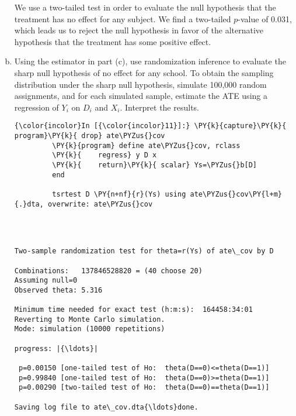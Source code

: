\documentclass[11pt,notitlepage]{article}\usepackage[]{graphicx}\usepackage[]{color}
\makeatletter
\newenvironment{kframe}{%
 \def\at@end@of@kframe{}%
 \ifinner\ifhmode%
  \def\at@end@of@kframe{\end{minipage}}%
  \begin{minipage}{\columnwidth}%
 \fi\fi%
 \def\FrameCommand##1{\hskip\@totalleftmargin \hskip-\fboxsep
 \colorbox{shadecolor}{##1}\hskip-\fboxsep
     \hskip-\linewidth \hskip-\@totalleftmargin \hskip\columnwidth}%
 \MakeFramed {\advance\hsize-\width
   \@totalleftmargin\z@ \linewidth\hsize
   \@setminipage}}%
 {\par\unskip\endMakeFramed%
 \at@end@of@kframe}
\newenvironment{knitrout}{}{} %
\makeatother
\begin{document}
\begin{enumerate}[a)]
\begin{knitrout}
\end{knitrout}
We use a two-tailed test in order to evaluate the null hypothesis that the treatment has no effect for any subject.  We find a two-tailed $p$-value of 0.031, which leads us to reject the null hypothesis in favor of the alternative hypothesis that the treatment has some positive effect.

\item Using the estimator in part (c), use randomization inference to evaluate the sharp null hypothesis of no effect for any school. To obtain the sampling distribution under the sharp null hypothesis, simulate 100,000 random assignments, and for each simulated sample, estimate the ATE using a regression of $Y_i$ on $D_i$ and $X_i$.  Interpret the results.

\begin{knitrout}
\color{fgcolor}\begin{kframe}
    \begin{Verbatim}[commandchars=\\\{\}]
{\color{incolor}In [{\color{incolor}11}]:} \PY{k}{capture}\PY{k}{ program}\PY{k}{ drop} ate\PYZus{}cov
         \PY{k}{program} define ate\PYZus{}cov, rclass
         \PY{k}{	regress} y D x
         \PY{k}{    return}\PY{k}{ scalar} Ys=\PYZus{}b[D]
         end
         
         tsrtest D \PY{n+nf}{r}(Ys) using ate\PYZus{}cov\PY{l+m}{.}dta, overwrite: ate\PYZus{}cov
\end{Verbatim}

    \begin{Verbatim}[commandchars=\\\{\}]



Two-sample randomization test for theta=r(Ys) of ate\_cov by D

Combinations:   137846528820 = (40 choose 20)
Assuming null=0
Observed theta: 5.316

Minimum time needed for exact test (h:m:s):  164458:34:01
Reverting to Monte Carlo simulation.
Mode: simulation (10000 repetitions)

progress: |{\ldots}|

 p=0.00150 [one-tailed test of Ho:  theta(D==0)<=theta(D==1)]
 p=0.99840 [one-tailed test of Ho:  theta(D==0)>=theta(D==1)]
 p=0.00290 [two-tailed test of Ho:  theta(D==0)==theta(D==1)]

Saving log file to ate\_cov.dta{\ldots}done.


\end{Verbatim}
\end{kframe}
\end{knitrout}
\end{enumerate}
\end{document}
